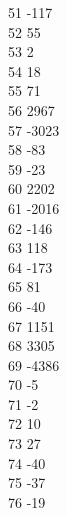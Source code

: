 { 51	-117 \\
 52	55 \\
 53	2 \\
 54	18 \\
 55	71 \\
 56	2967 \\
 57	-3023 \\
 58	-83 \\
 59	-23 \\
 60	2202 \\
 61	-2016 \\
 62	-146 \\
 63	118 \\
 64	-173 \\
 65	81 \\
 66	-40 \\
 67	1151 \\
 68	3305 \\
 69	-4386 \\
 70	-5 \\
 71	-2 \\
 72	10 \\
 73	27 \\
 74	-40 \\
 75	-37 \\
 76	-19 \\
}
